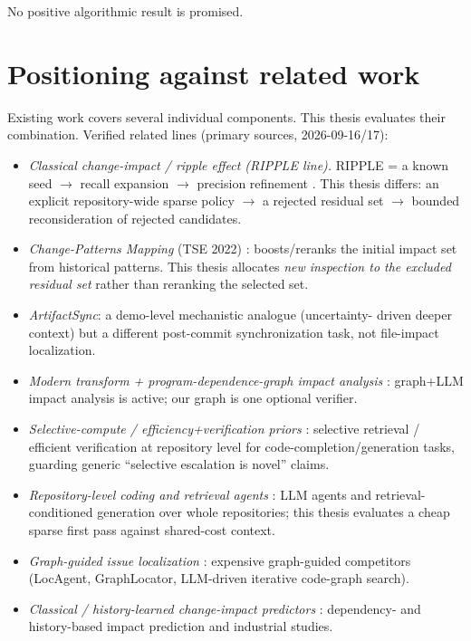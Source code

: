 \documentclass[11pt,a4paper]{article}
\begin{document}
No positive algorithmic result is promised.

\section{Positioning against related work}
\label{sec:related}

Existing work covers several individual components. This thesis evaluates their
combination. Verified related lines (primary sources, 2026-09-16/17):

\begin{itemize}
  \item \emph{Classical change-impact / ripple effect (RIPPLE line).}
  RIPPLE = a known seed $\rightarrow$ recall expansion $\rightarrow$ precision
  refinement \cite{haney1972_ripple}. This thesis differs: an explicit
  repository-wide sparse policy $\rightarrow$ a rejected residual set
  $\rightarrow$ bounded reconsideration of rejected candidates.
  \item \emph{Change-Patterns Mapping} (TSE 2022) \cite{huang2022changepatterns}:
  boosts/reranks the initial impact set from historical patterns. This thesis
  allocates \emph{new inspection to the excluded residual set} rather than
  reranking the selected set.
  \item \emph{ArtifactSync}: a demo-level mechanistic analogue (uncertainty-
  driven deeper context) but a different post-commit synchronization task, not
  file-impact localization.
  \item \emph{Modern transform + program-dependence-graph impact analysis}
  \cite{yan2026transformerpdg}: graph+LLM impact analysis is active; our graph
  is one optional verifier.
  \item \emph{Selective-compute / efficiency+verification priors}
  \cite{wu2024repoformer,zhao2025fastcoder}: selective retrieval / efficient
  verification at repository level for code-completion/generation tasks,
  guarding generic ``selective escalation is novel'' claims.
  \item \emph{Repository-level coding and retrieval agents}
  \cite{agentless2024,codeplan2024,repocoder2023,autocoderover2024,repoagent2024}:
  LLM agents and retrieval-conditioned generation over whole repositories;
  this thesis evaluates a cheap sparse first pass against shared-cost context.
  \item \emph{Graph-guided issue localization}
  \cite{locagent2025,graphlocator2026,jiang2025issueloc}: expensive graph-guided
  competitors (LocAgent, GraphLocator, LLM-driven iterative code-graph search).
  \item \emph{Classical / history-learned change-impact predictors}
  \cite{abdeen2015dependency,iwasaki2022impacttool,borg2017recommendationcia,etezadi2025llmcia}:
  dependency- and history-based impact prediction and industrial studies.
\end{itemize}
\end{document}
